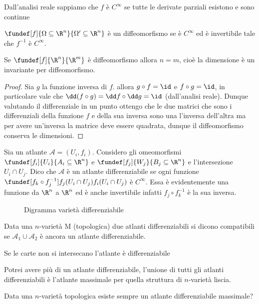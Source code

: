 \begin{defn}
Dall'analisi reale sappiamo che $f$ è $C^{\infty}$ se tutte le derivate parziali esistono e sono continue
\end{defn}
\begin{defn}[Diffeomorfismo]
$\fundef[f]{\Omega \subseteq \R^n}{\Omega' \subseteq \R^n}$ è un diffeomorfismo se è $C^\infty$ ed è invertibile tale che $f^{-1}$ è $C^{\infty}$.
\end{defn}
\begin{prop}
Se $\fundef[f]{\R^n}{\R^m}$ è diffeomorfismo allora $n = m$, cioè la dimensione è un invariante per diffeomorfismo.
\end{prop}
\begin{proof}
Sia $g$ la funzione inversa di $f$. allora $g \circ f = \id$ e $f \circ g = \id$, in particolare vale che $\dd(f \circ g) = \dd f \circ \dd g = \id$ (dall'analisi reale). Dunque valutando il differenziale in un punto ottengo che le due matrici che sono i differenziali della funzione $f$ e della sua inversa sono una l'inversa dell'altra ma per avere un'inversa la matrice deve essere quadrata, dunque il diffeomorfismo conserva le dimensioni.
\end{proof}
\begin{defn}
Sia un atlante $\mathcal{A} = {(U_i, f_i)}$. Considero gli omeomorfismi
$\fundef[f_i]{U_i}{A_i \subseteq \R^n }$ e $\fundef[f_j]{W_j}{B_j\subseteq \R^n}$ e l'intersezione 
$U_i \cap U_j$. Dico che $\mathcal{A}$ è un atlante differenziabile se ogni funzione $\fundef[f_k \circ f_j^{-1}]{f_j(U_i \cap U_j)}{f_i(U_i \cap U_j)}$ è $C^{\infty}$. Essa è evidentemente una funzione da $\R^n$ a $\R^n$ ed è anche invertibile infatti $f_j \circ f_k^{-1}$ è la sua inversa.
\end{defn}

\begin{figure}
    \centering %
    
    \caption{Digramma varietà differenziabile}
\end{figure}

\begin{defn} 
Data una $n$-varietà M (topologica) due atlanti differenziabili si dicono compatibili se $\mathcal{A}_1 \cup \mathcal{A}_2$ è ancora un atlante differenziabile.
\end{defn}
\begin{oss}
Se le carte non si intersecano l'atlante è differenziabile
\end{oss}
\begin{oss}
Potrei avere più di un atlante differenziabile, l'unione di tutti gli atlanti differenziabili è l'atlante massimale per quella struttura di $n$-varietà liscia.
\end{oss}
\begin{oss}
Data una $n$-varietà topologica esiste sempre un atlante differenziabile massimale?
\end{oss}